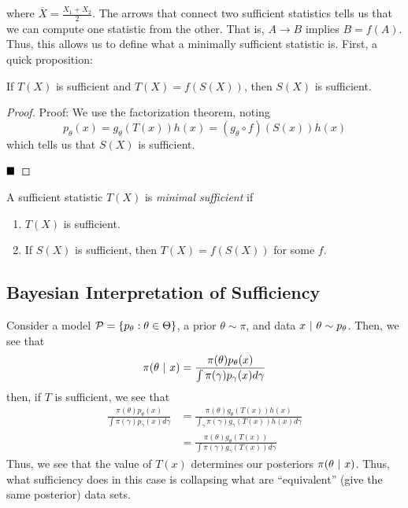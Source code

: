 \begin{center}
\end{center}
where $\overline{X} = \frac{X_1 + X_2}{2}$. The arrows that connect two sufficient statistics tells us that we can compute one statistic from the other. That is, $A \rightarrow B$ implies $B = f(A)$. Thus, this allows us to define what a minimally sufficient statistic is. First, a quick proposition:

\begin{lemma}
    If $T(X)$ is sufficient and $T(X) = f(S(X))$, then $S(X)$ is sufficient.
\end{lemma}
\begin{proof}{Proof:}
    We use the factorization theorem, noting 
    \[ p_{\theta}(x) = g_{\theta}(T(x))h(x) = (g_{\theta} \circ f)(S(x))h(x) \]
    which tells us that $S(X)$ is sufficient. 

    $\qed$
\end{proof}

\begin{definition}
    A sufficient statistic $T(X)$ is \emph{minimal sufficient} if
    \begin{enumerate}
        \item $T(X)$ is sufficient.
        \item If $S(X)$ is sufficient, then $T(X) = f(S(X))$ for some $f$. 
    \end{enumerate}
\end{definition}

\subsection*{Bayesian Interpretation of Sufficiency}
\sectionspace

Consider a model $\cal{P} = \{p_{\theta} : \theta \in \Theta\}$, a prior $\theta \sim \pi$, and data $x \given \theta \sim p_{\theta}$. Then, we see that
\[ \pi(\theta \given x) = \frac{\pi(\theta)p_{\theta}(x)}{\int \pi(\gamma)p_{\gamma}(x)d\gamma} \]
then, if $T$ is sufficient, we see that
\begin{align*}
    \frac{\pi(\theta)p_{\theta}(x)}{\int \pi(\gamma)p_{\gamma}(x)d\gamma} &= \frac{\pi(\theta)g_{\theta}(T(x))h(x)}{\int_{\gamma}\pi(\gamma)g_{\gamma}(T(x))h(x)d\gamma}\\
    &= \frac{\pi(\theta)g_{\theta}(T(x))}{\int \pi(\gamma)g_{\gamma}(T(x))d\gamma}
\end{align*}
Thus, we see that the value of $T(x)$ determines our posteriors $\pi(\theta \given x)$. Thus, what sufficiency does in this case is collapsing what are ``equivalent'' (give the same posterior) data sets.\\

